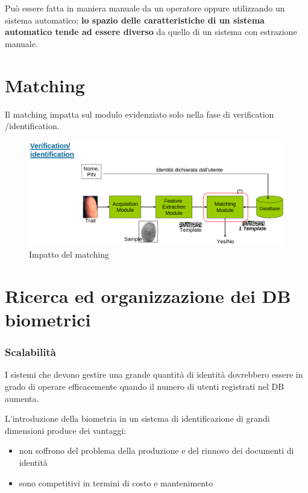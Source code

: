 \noindent Può essere fatta in maniera manuale da un operatore oppure utilizzando un sistema automatico; \textbf{lo spazio delle 
caratteristiche di un sistema automatico tende ad essere diverso} da quello di un sistema con estrazione manuale.

\section{Matching}

Il matching impatta sul modulo evidenziato solo nella fase di verification\\/identification.

\begin{figure}[ht]
    \centering
    \includegraphics[width=1\linewidth]{chapters/images-chap2/matching.png}
    \caption{Impatto del matching}
\end{figure}

\section{Ricerca ed organizzazione dei DB biometrici}

\subsubsection{Scalabilità}

I sistemi che devono gestire una grande quantità di
identità dovrebbero essere in grado di operare
efficacemente quando il numero di utenti registrati nel DB
aumenta.

\noindent L'introduzione della biometria in un sistema di identificazione di grandi dimensioni produce dei vantaggi:
\begin{itemize}
    \item non soffrono del problema della produzione e del rinnovo dei documenti di identità
    \item sono competitivi in termini di costo e mantenimento
\end{itemize}

